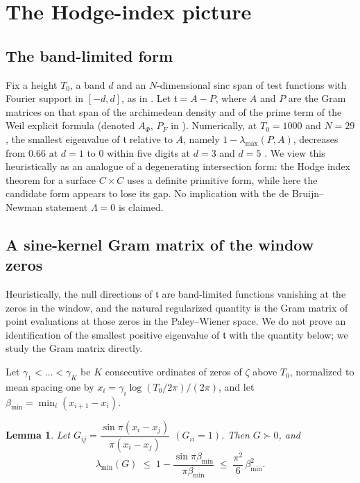\documentclass[11pt]{amsart}
\newtheorem{lemma}[theorem]{Lemma}
\theoremstyle{definition}
\theoremstyle{remark}
\newcommand{\bmin}{\beta_{\min}}
\begin{document}
\section{The Hodge-index picture}\label{sec:hodge}

\subsection{The band-limited form}
Fix a height $T_0$, a band $d$ and an $N$-dimensional sinc span of test functions with Fourier support in
$[-d,d]$, as in \cite{P12}. Let $\mathfrak t=A-P$, where $A$ and $P$ are the Gram matrices on that span of the
archimedean density and of the prime term of the Weil explicit formula (denoted $A_\Phi$, $P_F$ in \cite{P12}).
Numerically, at $T_0=1000$ and $N=29$, the smallest eigenvalue of $\mathfrak t$ relative to $A$, namely
$1-\lambda_{\max}(P,A)$, decreases from $0.66$ at $d=1$ to $0$ within five digits at $d=3$ and $d=5$
\cite[Observation ``Numerical saturation'']{P12}. We view
this heuristically as an analogue of a degenerating intersection form: the Hodge index theorem for a surface
$C\times C$ uses a definite primitive form, while here the candidate form appears to lose its gap. No
implication with the de Bruijn--Newman statement $\Lambda=0$ is claimed.

\subsection{A sine-kernel Gram matrix of the window zeros}
Heuristically, the null directions of $\mathfrak t$ are band-limited functions vanishing at the zeros in the
window, and the natural regularized quantity is the Gram matrix of point evaluations at those zeros in the
Paley--Wiener space. We do not prove an identification of the smallest positive eigenvalue of $\mathfrak t$
with the quantity below; we study the Gram matrix directly.

Let $\gamma_1<\dots<\gamma_K$ be $K$ consecutive ordinates of zeros of $\zeta$ above $T_0$, normalized to mean
spacing one by $x_i=\gamma_i\log(T_0/2\pi)/(2\pi)$, and let $\bmin=\min_i(x_{i+1}-x_i)$.

\begin{lemma}\label{thm:reggap}
Let $G_{ij}=\dfrac{\sin\pi(x_i-x_j)}{\pi(x_i-x_j)}$ $(G_{ii}=1)$. Then $G\succ0$, and
\begin{equation}\label{eq:gapident}
\lambda_{\min}(G)\;\le\;1-\frac{\sin\pi\bmin}{\pi\bmin}\;\le\;\frac{\pi^2}{6}\,\bmin^2 .
\end{equation}
\end{lemma}
\end{document}
